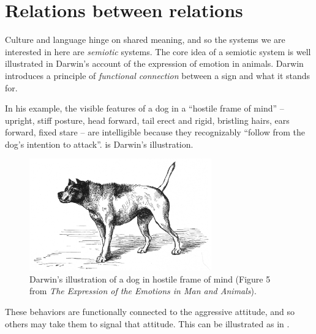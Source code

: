 

\section{Relations between relations}

Culture and language hinge on shared meaning, and so the systems we are interested in here are \textit{semiotic }systems. The core idea of a semiotic system 
is well illustrated in Darwin's account of the expression of emotion in 
animals. Darwin introduces a principle of \textit{functional connection 
}between a sign and what it stands for. 



In his example, the visible features of a dog in a ``hostile frame of 
mind'' -- upright, stiff posture, head forward, tail erect and rigid, 
bristling hairs, ears forward, fixed stare -- are intelligible because they 
recognizably ``follow from the dog's intention to attack''.  is 
Darwin's illustration.


\begin{figure}[p]
\includegraphics[width=0.70\textwidth,keepaspectratio]{figures/Fig01}
\caption{Darwin's illustration of a dog in hostile frame of mind 
(Figure 5 from \textit{The Expression of the Emotions in Man and 
Animals}).}
\label{darwin1}
\end{figure}



These behaviors are functionally connected to the aggressive attitude, 
and so others may take them to signal that attitude. This can be illustrated as in  .

